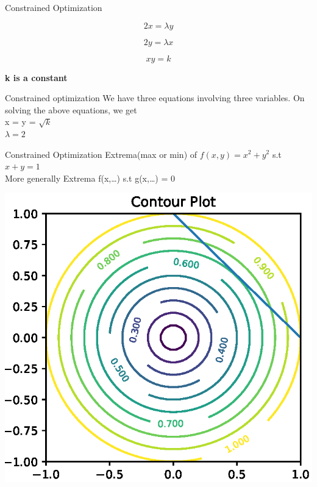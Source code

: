 \documentclass{beamer}
\begin{document}
\begin{frame}{Constrained Optimization}
    
    \begin{equation}
            2x = \lambda y
    \end{equation}
    
    
    \begin{equation}
            2y = \lambda x
    \end{equation}
    
    
    \begin{equation}
            xy = k
    \end{equation}
    
    \textbf{k is a constant}
\end{frame}

\begin{frame}{Constrained optimization}
    We have three equations involving three variables. 
    On solving the above equations, we get\\
    x = y = $\sqrt{k}$\\
    $\lambda = 2$\\
\end{frame}

\begin{frame}{Constrained Optimization}
    Extrema(max or min) of $f(x,y) = x^{2} + y^{2}$ s.t $x + y = 1$\\
    
    \vspace{2em}
    More generally Extrema f(x,\dots) s.t g(x,\dots) = 0
      		\begin{center}
    	\includegraphics[totalheight=6cm]{ml-maths/contour-plot-7.eps}
    \end{center}

\end{frame}
\end{document}
